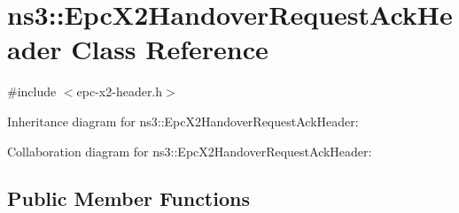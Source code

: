 \hypertarget{classns3_1_1EpcX2HandoverRequestAckHeader}{}\section{ns3\+:\+:Epc\+X2\+Handover\+Request\+Ack\+Header Class Reference}
\label{classns3_1_1EpcX2HandoverRequestAckHeader}


{\ttfamily \#include $<$epc-\/x2-\/header.\+h$>$}



Inheritance diagram for ns3\+:\+:Epc\+X2\+Handover\+Request\+Ack\+Header\+:


Collaboration diagram for ns3\+:\+:Epc\+X2\+Handover\+Request\+Ack\+Header\+:
\subsection*{Public Member Functions}
